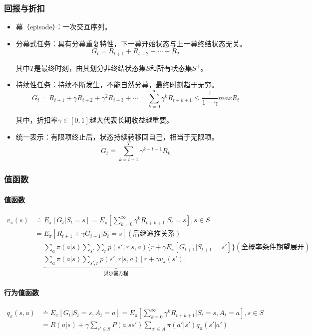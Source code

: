 \documentclass[
12pt, %
a4paper, 
oneside, %
headinclude,footinclude, %
]{scrartcl}
\begin{document}
\subsubsection[回报与折扣]{回报与折扣}
\begin{itemize}
\item 幕（episode）：一次交互序列。
\item 分幕式任务：具有分幕重复特性，下一幕开始状态与上一幕终结状态无关。
$$ G_t = R_{t + 1} + R_{t + 2} + \cdots + R_T $$

其中$ T $是最终时刻，由其划分非终结状态集$ S $和所有状态集$ S^+ $。
\item 持续性任务：持续不断发生，不能自然分幕，最终时刻趋于无穷。
$$ G_t = R_{t + 1} + \gamma R_{t + 2} + \gamma^2 R_{t + 3} + \cdots = \sum_{k = 0}^{\infty} \gamma^k R_{t + k + 1} \leq \frac{1}{1 - \gamma}max R_t $$

其中，折扣率$ \gamma \in [0, 1] $越大代表长期收益越重要。
\item 统一表示：有限项终止后，状态持续转移回自己，相当于无限项。
$$ G_t \doteq \sum_{k = t + 1}^{T} \gamma^{k - t - 1} R_k $$
\end{itemize}
\subsubsection[值函数]{值函数}
\paragraph{值函数}
\begin{align*}
v_\pi(s) 
&\doteq E_\pi[G_t|S_t = s] = E_\pi[\sum_{k = 0}^{\infty} \gamma^k R_{t + k + 1}|S_t = s], s \in S \\
&= E_\pi[R_{t + 1} + \gamma G_{t+1}|S_t = s] (\text{后继递推关系}) \\
&= \sum_a \pi(a|s) \sum_{s'} \sum_r p(s', r|s, a)\{r + \gamma E_\pi[G_{t + 1}|S_{t + 1} = s']\} (\text{全概率条件期望展开}) \\
&= \underbrace{\sum_a \pi(a|s) \sum_{s', r} p(s', r|s, a)[r + \gamma v_\pi(s')]}_{\text{贝尔曼方程}}
\end{align*}
\paragraph{行为值函数}
\begin{align*} 
q_\pi(s, a) &\doteq E_\pi[G_t|S_t = s, A_t = a] = E_\pi[\sum_{k = 0}^{\infty} \gamma^k R_{t + k + 1}|S_t = s, A_t = a], s \in S \\
&= R(a|s) + \gamma \sum_{s' \in S} P(a|ss') \sum_{a' \in A} \pi(a'|s')q_{\pi}(s'|a')
\end{align*}
\end{document}
